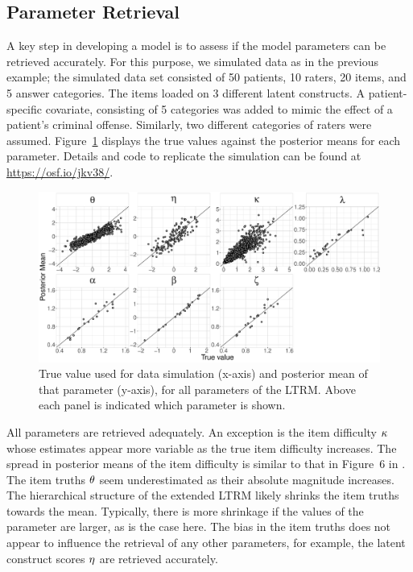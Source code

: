 \documentclass[a4paper,usenames,dvipsnames]{article}
\newcommand{\DON}	[1] 	{}%
\newcommand{\MR}	[1] 	{}%
\newcommand{\osflink}{\url{https://osf.io/jkv38/}}
\begin{document}
\subsection*{Parameter Retrieval}
A key step in developing a model is to assess if the model parameters can be retrieved accurately. For this purpose, we simulated data as in the previous example; the simulated data set consisted of 50 patients, 10 raters, 20 items, and 5 answer categories. The items loaded on 3 different latent constructs. A patient-specific covariate, consisting of 5 categories was added to mimic the effect of a patient's criminal offense. Similarly, two different categories of raters were assumed. Figure~\ref{fig:parameterRecoveryELTRM} displays the true values against the posterior means for each parameter. Details and code to replicate the simulation can be found at \osflink{}.
\MR{more simulation details given tablet appendix OSF . . . there's very little info here to know what you did}
\DON{Do we want to elaborate more?}
\begin{figure}[!ht]
	\centering
	\includegraphics[width= \textwidth]{figures/parameterRecoveryModel2.pdf}
	\caption{True value used for data simulation (x-axis) and posterior mean of that parameter (y-axis), for all parameters of the LTRM. Above each panel is indicated which parameter is shown.}
	\label{fig:parameterRecoveryELTRM}
\end{figure}

All parameters are retrieved adequately. An exception is the item difficulty $\kappa$ whose estimates appear more variable as the true item difficulty increases. The spread in posterior means of the item difficulty is similar to that in Figure~6 in \AB{}. The item truths $\theta$ seem underestimated as their absolute magnitude increases. The hierarchical structure of the extended LTRM likely shrinks the item truths towards the mean. Typically, there is more shrinkage if the values of the parameter are larger, as is the case here. The bias in the item truths does not appear to influence the retrieval of any other parameters, for example, the latent construct scores $\eta$ are retrieved accurately. %
\end{document}
